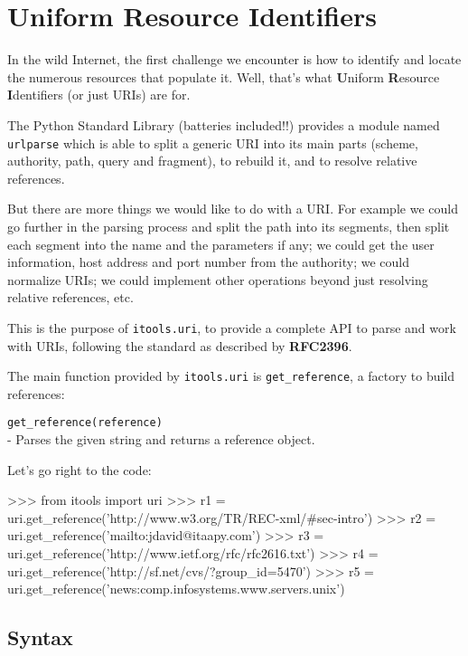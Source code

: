 
\chapter{Uniform Resource Identifiers}

In the wild Internet, the first challenge we encounter is how to identify
and locate the numerous resources that populate it. Well, that's what
{\bf U}niform {\bf R}esource {\bf I}dentifiers (or just URIs) are for.

The Python Standard Library (batteries included!!) provides a module named
{\tt urlparse} which is able to split a generic URI into its main parts
(scheme, authority, path, query and fragment), to rebuild it, and to
resolve relative references.

But there are more things we would like to do with a URI. For example we
could go further in the parsing process and split the path into its segments,
then split each segment into the name and the parameters if any; we could
get the user information, host address and port number from the authority;
we could normalize URIs; we could implement other operations beyond just
resolving relative references, etc.

This is the purpose of {\tt itools.uri}, to provide a complete API to parse
and work with URIs, following the standard as described by {\bf RFC2396}.

The main function provided by {\tt itools.uri} is {\tt get\_reference},
a factory to build references:

\begin{api}
    {\tt get\_reference(reference)}\\
    - Parses the given string and returns a reference object.
\end{api}

Let's go right to the code:

\begin{code}
    >>> from itools import uri
    >>> r1 = uri.get_reference('http://www.w3.org/TR/REC-xml/#sec-intro')
    >>> r2 = uri.get_reference('mailto:jdavid@itaapy.com')
    >>> r3 = uri.get_reference('http://www.ietf.org/rfc/rfc2616.txt')
    >>> r4 = uri.get_reference('http://sf.net/cvs/?group_id=5470')
    >>> r5 = uri.get_reference('news:comp.infosystems.www.servers.unix')
\end{code}


\section{Syntax}

